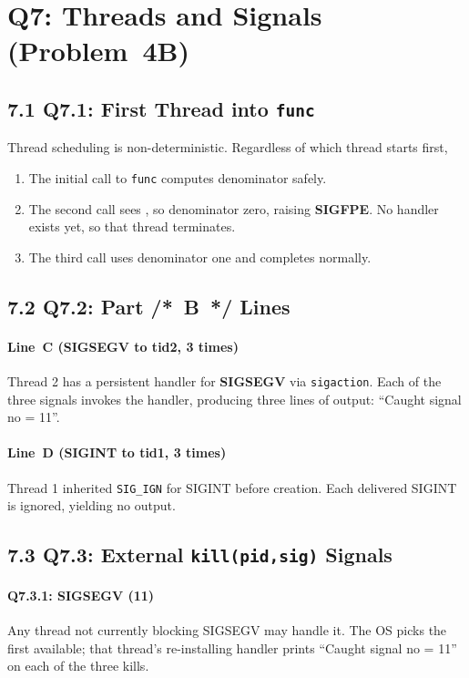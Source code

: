\documentclass[12pt]{article}
\begin{document}
	\section*{Q7: Threads and Signals (Problem 4B)}
	\subsection*{7.1 Q7.1: First Thread into \texttt{func}}
	Thread scheduling is non-deterministic. Regardless of which thread starts first,
	\begin{enumerate}
		\item The initial call to \texttt{func} computes denominator  safely.
		\item The second call sees , so denominator zero, raising \textbf{SIGFPE}. No handler exists yet, so that thread terminates.
		\item The third call uses denominator one and completes normally.
	\end{enumerate}
	
	\subsection*{7.2 Q7.2: Part /* B */ Lines}
	\paragraph{Line C (SIGSEGV to tid2, 3 times)}
	Thread 2 has a persistent handler for \textbf{SIGSEGV} via \texttt{sigaction}. Each of the three signals invokes the handler, producing three lines of output: ``Caught signal no = 11''.
	
	\paragraph{Line D (SIGINT to tid1, 3 times)}
	Thread 1 inherited \texttt{SIG\_IGN} for SIGINT before creation. Each delivered SIGINT is ignored, yielding no output.
	
	\subsection*{7.3 Q7.3: External \texttt{kill(pid,sig)} Signals}
	\paragraph{Q7.3.1: SIGSEGV (11)}
	Any thread not currently blocking SIGSEGV may handle it. The OS picks the first available; that thread’s re-installing handler prints ``Caught signal no = 11'' on each of the three kills.
	
\end{document}
